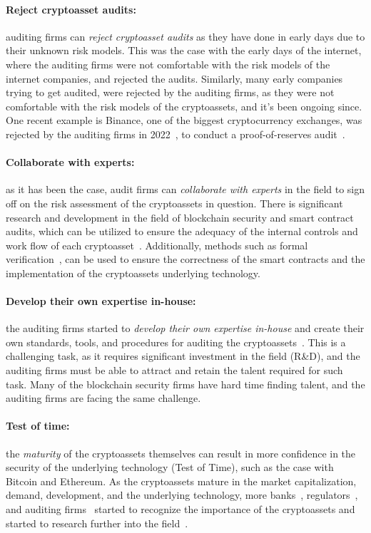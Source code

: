 \paragraph{Reject cryptoasset audits:} auditing firms can \textit{reject cryptoasset audits} as they have done in early days due to their unknown risk models. This was the case with the early days of the internet, where the auditing firms were not comfortable with the risk models of the internet companies, and rejected the audits. Similarly, many early companies trying to get audited, were rejected by the auditing firms, as they were not comfortable with the risk models of the cryptoassets, and it's been ongoing since. One recent example is Binance, one of the biggest cryptocurrency exchanges, was rejected by the auditing firms in 2022~\cite{binanceauditorrejection}, to conduct a proof-of-reserves audit~\cite{dagher2015provisions}.

\paragraph{Collaborate with experts:} as it has been the case, audit firms can \textit{collaborate with experts} in the field to sign off on the risk assessment of the cryptoassets in question. There is significant research and development in the field of blockchain security and smart contract audits, which can be utilized to ensure the adequacy of the internal controls and work flow of each cryptoasset~\cite{krakenproofofreserve}. Additionally, methods such as formal verification~\cite{clark2018sok8}, can be used to ensure the correctness of the smart contracts and the implementation of the cryptoassets underlying technology. 

\paragraph{Develop their own expertise in-house:} the auditing firms started to \textit{develop their own expertise in-house} and create their own standards, tools, and procedures for auditing the cryptoassets~\cite{eyInternalTools,delloiteinternalauditor}. This is a challenging task, as it requires significant investment in the field (R\&D), and the auditing firms must be able to attract and retain the talent required for such task. Many of the blockchain security firms have hard time finding talent, and the auditing firms are facing the same challenge. 

\paragraph{Test of time:} the \textit{maturity} of the cryptoassets themselves can result in more confidence in the security of the underlying technology (Test of Time), such as the case with Bitcoin and Ethereum. As the cryptoassets mature in the market capitalization, demand, development, and the underlying technology, more banks~\cite{azar2022financial,bankofenglandmaturity}, regulators~\cite{govofcanadamaturity,treasury2023future}, and auditing firms~\cite{kpmgadoption} started to recognize the importance of the cryptoassets and started to research further into the field~\cite{basel2021prudential,drozdz2023mature}. 

